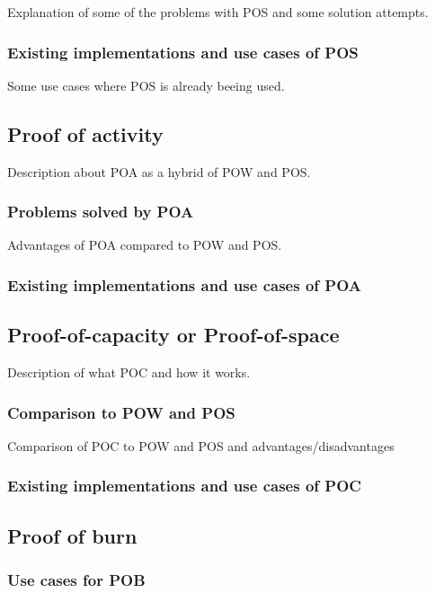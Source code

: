 \documentclass{acm_proc_article-sp}
\begin{document}
Explanation of some of the problems with POS and some solution attempts.


\subsubsection{Existing implementations and use cases of POS}

Some use cases where POS is already beeing used.


\subsection{Proof of activity}

Description about POA as a hybrid of POW and POS.


\subsubsection{Problems solved by POA}

Advantages of POA compared to POW and POS.


\subsubsection{Existing implementations and use cases of POA}


\subsection{Proof-of-capacity or Proof-of-space}

Description of what POC and how it works.


\subsubsection{Comparison to POW and POS}

Comparison of POC to POW and POS and advantages/disadvantages


\subsubsection{Existing implementations and use cases of POC}


\subsection{Proof of burn}


\subsubsection{Use cases for POB}
\end{document}
